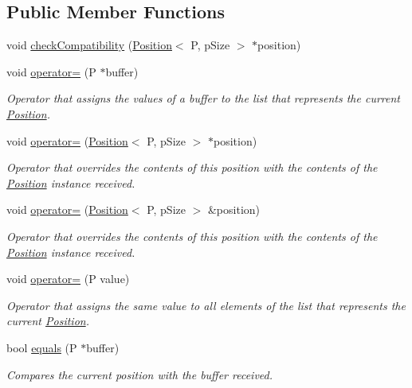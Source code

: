 \subsection*{Public Member Functions}
\begin{DoxyCompactItemize}
\item 
void \hyperlink{structPosition_ac9d8d79414e34bd4486b8fc047cdb5bd}{check\+Compatibility} (\hyperlink{structPosition}{Position}$<$ P, p\+Size $>$ $\ast$position)
\item 
void \hyperlink{structPosition_a83f7d5b691551f2daba6cb46fff57a46}{operator=} (P $\ast$buffer)
\begin{DoxyCompactList}\small\item\em Operator that assigns the values of a buffer to the list that represents the current \hyperlink{structPosition}{Position}. \end{DoxyCompactList}\item 
void \hyperlink{structPosition_a591cf87fe7b6708caec26383103d8cfd}{operator=} (\hyperlink{structPosition}{Position}$<$ P, p\+Size $>$ $\ast$position)
\begin{DoxyCompactList}\small\item\em Operator that overrides the contents of this position with the contents of the \hyperlink{structPosition}{Position} instance received. \end{DoxyCompactList}\item 
void \hyperlink{structPosition_a7b80895e913c9b5d59e8b71ee7205858}{operator=} (\hyperlink{structPosition}{Position}$<$ P, p\+Size $>$ \&position)
\begin{DoxyCompactList}\small\item\em Operator that overrides the contents of this position with the contents of the \hyperlink{structPosition}{Position} instance received. \end{DoxyCompactList}\item 
void \hyperlink{structPosition_a4fbd10c84ee75c05fedce1ca556f4f88}{operator=} (P value)
\begin{DoxyCompactList}\small\item\em Operator that assigns the same value to all elements of the list that represents the current \hyperlink{structPosition}{Position}. \end{DoxyCompactList}\item 
bool \hyperlink{structPosition_af78cd02c57904a56e97393857b8765eb}{equals} (P $\ast$buffer)
\begin{DoxyCompactList}\small\item\em Compares the current position with the buffer received. \end{DoxyCompactList}\item 

\end{DoxyCompactItemize}
